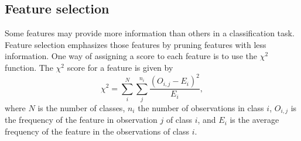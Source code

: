 \subsection{Feature selection}
Some features may provide more information than others in a classification task. Feature selection emphasizes those features by pruning features with less information. One way of assigning a score to each feature is to use the $\chi^2$ function. The $\chi^2$ score for a feature is given by
\[
\chi^2 = \sum_i^N \sum_j^{n_i} \frac{\left ( O_{i,j} - E_i \right )^2}{E_i},
\]
where $N$ is the number of classes, $n_i$ the number of observations in class $i$, $O_{i,j}$ is the frequency of the feature in observation $j$ of class $i$, and $E_i$ is the average frequency of the feature in the observations of class $i$. 